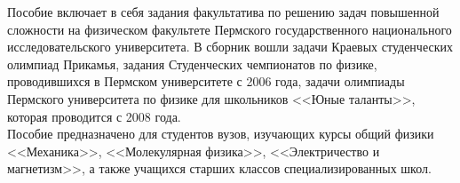 Пособие включает в себя задания факультатива по решению задач повышенной сложности на физическом факультете Пермского государственного национального исследовательского университета. В сборник вошли задачи Краевых студенческих олимпиад Прикамья, задания Студенческих чемпионатов по физике, проводившихся в Пермском университете с 2006 года, задачи олимпиады Пермского университета по физике для школьников <<Юные таланты>>, которая проводится с 2008 года.  \\
\indent Пособие предназначено для студентов вузов, изучающих курсы общий физики <<Механика>>, <<Молекулярная физика>>, <<Электричество и магнетизм>>, а также учащихся старших классов специализированных школ.